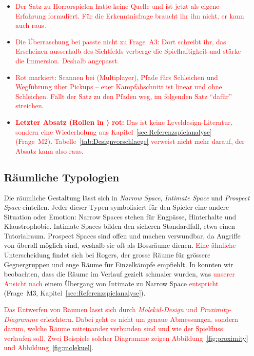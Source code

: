 \documentclass[../Main.tex]{subfiles}
\begin{document}
\begin{itemize}[leftmargin=1.5cm]
    \item \textcolor{red}{Der Satz zu Horrorspielen hatte keine Quelle und ist jetzt als eigene Erfahrung formuliert. Für die Erkenntnisfrage braucht ihr ihn nicht, er kann auch raus.}
    \item \textcolor{red}{Die Überraschung bei  passte nicht zu Frage~A3: Dort schreibt ihr, das Erscheinen ausserhalb des Sichtfelds verberge die Spielhaftigkeit und stärke die Immersion. Deshalb angepasst.}
    \item \textcolor{red}{Rot markiert: Scannen bei  (Multiplayer), Pfade fürs Schleichen und Wegführung über Pickups -- euer Kampfabschnitt ist linear und ohne Schleichen. Fällt der Satz zu den Pfaden weg, im folgenden Satz \enquote{dafür} streichen.}
    \item \textcolor{red}{\textbf{Letzter Absatz (Rollen in ) rot:} Das ist keine Leveldesign-Literatur, sondern eine Wiederholung aus Kapitel~\ref{sec:Referenzspielanalyse} (Frage~M2). Tabelle~\ref{tab:Designvorschlaege} verweist nicht mehr darauf, der Absatz kann also raus.}
\end{itemize}

\subsection{Räumliche Typologien} \label{sec:Raumtypologien}
Die räumliche Gestaltung lässt sich in \textit{Narrow Space}, \textit{Intimate Space} und \textit{Prospect Space} einteilen. Jeder dieser Typen symbolisiert für den Spieler eine andere Situation oder Emotion: Narrow Spaces stehen für Engpässe, Hinterhalte und Klaustrophobie. Intimate Spaces bilden den sicheren Standardfall, etwa einen Tutorialraum. Prospect Spaces sind offen und machen verwundbar, da Angriffe von überall möglich sind, weshalb sie oft als Bossräume dienen.\autocite[161--168]{totten2014architectural} \textcolor{red}{Eine ähnliche} Unterscheidung findet sich bei Rogers, der grosse Räume für grössere Gegnergruppen und enge Räume für Einzelkämpfe empfiehlt.\autocite[245]{rogers2014levelup} In  konnten wir beobachten, dass die Räume im Verlauf gezielt schmaler wurden, was \textcolor{red}{unserer Ansicht nach} einem Übergang von Intimate zu Narrow Space \textcolor{red}{entspricht} (Frage~M3, Kapitel~\ref{sec:Referenzspielanalyse}).

\textcolor{red}{Das Entwerfen von Räumen lässt sich durch \textit{Molekül-Design} und \textit{Proximity-Diagramme} erleichtern. Dabei geht es nicht um genaue Abmessungen, sondern darum, welche Räume miteinander verbunden sind und wie der Spielfluss verlaufen soll.\autocite[168--169]{totten2014architectural} Zwei Beispiele solcher Diagramme zeigen Abbildung~\ref{fig:proximity} und Abbildung~\ref{fig:molekuel}.}
\end{document}
